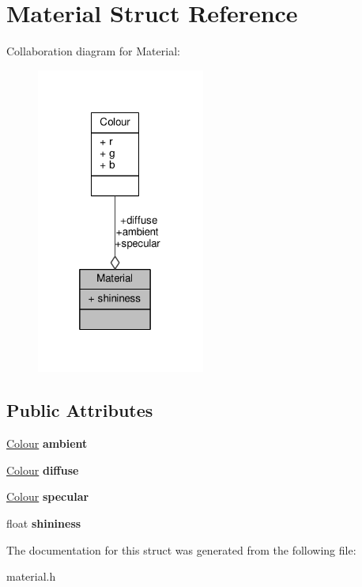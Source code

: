 \hypertarget{struct_material}{}\section{Material Struct Reference}
\label{struct_material}


Collaboration diagram for Material\+:\nopagebreak
\begin{figure}[H]
\begin{center}
\leavevmode
\includegraphics[width=157pt]{struct_material__coll__graph}
\end{center}
\end{figure}
\subsection*{Public Attributes}
\begin{DoxyCompactItemize}
\item 
\hyperlink{struct_colour}{Colour} {\bfseries ambient}\hypertarget{struct_material_a6946c65f77b05aa25bb92eaffa7b87c9}{}\label{struct_material_a6946c65f77b05aa25bb92eaffa7b87c9}

\item 
\hyperlink{struct_colour}{Colour} {\bfseries diffuse}\hypertarget{struct_material_a87015a28f42c846ccf0f8d1637f20988}{}\label{struct_material_a87015a28f42c846ccf0f8d1637f20988}

\item 
\hyperlink{struct_colour}{Colour} {\bfseries specular}\hypertarget{struct_material_a95cd1427d513fdf9220053fdd709e390}{}\label{struct_material_a95cd1427d513fdf9220053fdd709e390}

\item 
float {\bfseries shininess}\hypertarget{struct_material_a9dc184c883ec135ace28c1917af3fe84}{}\label{struct_material_a9dc184c883ec135ace28c1917af3fe84}

\end{DoxyCompactItemize}


The documentation for this struct was generated from the following file\+:\begin{DoxyCompactItemize}
\item 
material.\+h\end{DoxyCompactItemize}
